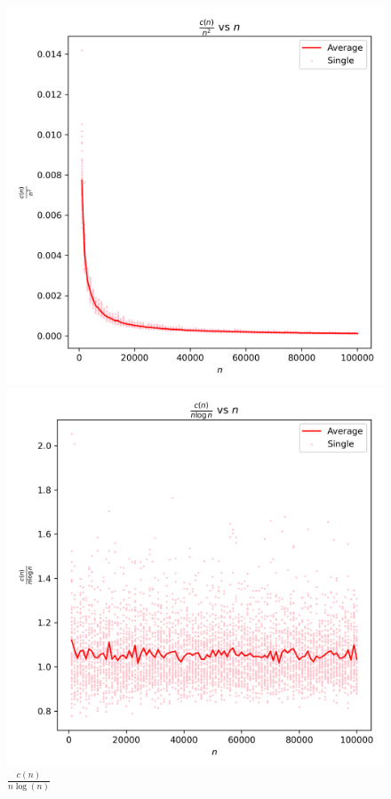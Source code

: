 \documentclass{article}
\begin{document}
\begin{figure}[H]
\begin{minipage}{0.24\textwidth}
        \caption{$\frac{c(n)}{n}$}
    \end{minipage}
    \begin{minipage}{0.24\textwidth}
        \centering
        \includegraphics[width=\linewidth]{graphs/c_factor_over_n_squared_vs_n.png}
        \caption{$\frac{c(n)}{n^2}$}
    \end{minipage}
        \begin{minipage}{0.24\textwidth}
        \centering
        \includegraphics[width=\linewidth]{graphs/c_factor_over_n_log_n_vs_n.png}
        \caption{$\frac{c(n)}{n \log(n)}$}
    \end{minipage}
\end{figure}
\end{document}
